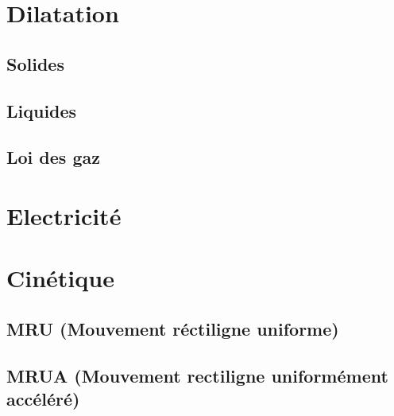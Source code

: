 \documentclass{article}
\begin{document}
\pagebreak
\section{Dilatation}

\subsection{Solides}

\subsection{Liquides}

\subsection{Loi des gaz}

\pagebreak
\section{Electricité}

\pagebreak
\section{Cinétique}

\subsection{MRU (Mouvement réctiligne uniforme)}

\subsection{MRUA (Mouvement rectiligne uniformément accéléré)}
\end{document}
